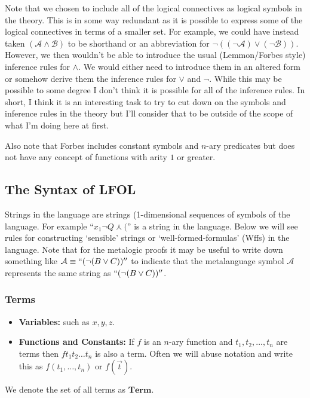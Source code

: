 \documentclass[12pt]{article}
\newcommand{\mc}[1]{\mathcal{#1}}
\begin{document}
Note that we chosen to include all of the logical connectives as logical symbols in the theory. This is in some way redundant as it is possible to express some of the logical connectives in terms of a smaller set. For example, we could have instead taken $(\mc{A} \land \mc{B})$ to be shorthand or an abbreviation for $\lnot((\lnot\mc{A})\lor(\lnot \mc{B}))$. However, we then wouldn't be able to introduce the usual (Lemmon/Forbes style) inference rules for $\land$. We would either need to introduce them in an altered form or somehow derive them the inference rules for $\lor$ and $\lnot$.  While this may be possible to some degree I don't think it is possible for all of the inference rules. In short, I think it is an interesting task to try to cut down on the symbols and inference rules in the theory but I'll consider that to be outside of the scope of what I'm doing here at first.

Also note that Forbes includes constant symbols and $n$-ary predicates but does not have any concept of functions with arity $1$ or greater.

\subsection*{The Syntax of LFOL}

Strings in the language are strings (1-dimensional sequences of symbols of the language. For example ``$x_1 \lnot Q \curlywedge ($'' is a string in the language. Below we will see rules for constructing `sensible' strings or `well-formed-formulas' (Wffs) in the language. Note that for the metalogic proofs it may be useful to write down something like $\mc{A} \equiv ``(\lnot(B\lor C))''$ to indicate that the metalanguage symbol $\mc{A}$ represents the same string as $``(\lnot(B \lor C))''$.

\hrulefill
\subsubsection*{Terms}
\begin{itemize}
\item{\textbf{Variables:} such as $x,y,z$.}
\item{\textbf{Functions and Constants:} If $f$ is an $n$-ary function and $t_1,t_2,\ldots, t_n$ are terms then $ft_1t_2\ldots t_n$ is also a term. Often we will abuse notation and write this as $f(t_1,
\ldots,t_n)$ or $f(\vec{t})$.}
\end{itemize}

We denote the set of all terms as $\mathbf{Term}$.
\end{document}

